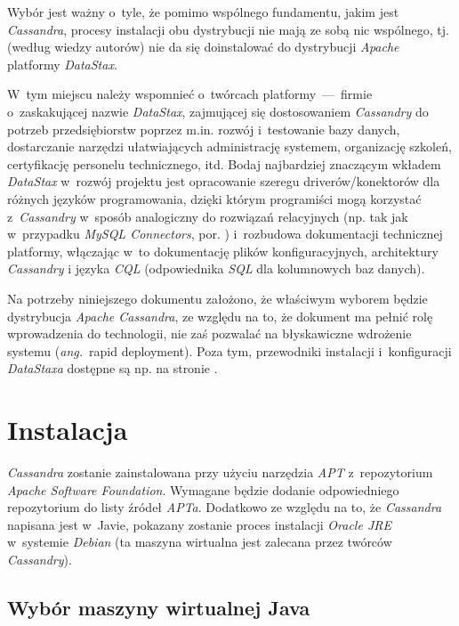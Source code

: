 \documentclass{article} %
\begin{document}
Wybór jest ważny o~tyle, że pomimo wspólnego fundamentu, jakim jest \emph{Cassandra}, procesy instalacji obu dystrybucji nie mają ze sobą nic wspólnego, tj. (według wiedzy autorów) nie da się doinstalować do dystrybucji \emph{Apache} platformy \emph{DataStax}.

W~tym miejscu należy wspomnieć o~twórcach platformy~---~firmie o~zaskakującej nazwie \emph{DataStax}, zajmującej się dostosowaniem \emph{Cassandry} do potrzeb przedsiębiorstw poprzez m.in. rozwój i~testowanie bazy danych, dostarczanie narzędzi ułatwiających administrację systemem, organizację szkoleń, certyfikację personelu technicznego, itd.
Bodaj najbardziej znaczącym wkładem \emph{DataStax} w~rozwój projektu jest opracowanie szeregu driverów/konektorów dla różnych języków programowania, dzięki którym programiści mogą korzystać z~\emph{Cassandry} w~sposób analogiczny do rozwiązań relacyjnych (np. tak jak w~przypadku \emph{MySQL Connectors}, por. \cite{mysql_connectors}) i~rozbudowa dokumentacji technicznej platformy, włączając w~to dokumentację plików konfiguracyjnych, architektury \emph{Cassandry} i języka \emph{CQL} (odpowiednika \emph{SQL} dla kolumnowych baz danych).

Na potrzeby niniejszego dokumentu założono, że właściwym wyborem będzie dystrybucja \emph{Apache Cassandra}, ze względu na to, że dokument ma pełnić rolę wprowadzenia do technologii, nie zaś pozwalać na błyskawiczne wdrożenie systemu (\textit{ang.}~rapid deployment).
Poza tym, przewodniki instalacji i~konfiguracji \emph{DataStaxa} dostępne są np. na stronie \cite{datastax_guides}.

\section{Instalacja}\label{sec:install}

\emph{Cassandra} zostanie zainstalowana przy użyciu narzędzia \emph{APT} z~repozytorium \emph{Apache Software Foundation}.
Wymagane będzie dodanie odpowiedniego repozytorium do listy źródeł \emph{APTa}.
Dodatkowo ze względu na to, że \emph{Cassandra} napisana jest w~Javie, pokazany zostanie proces instalacji \emph{Oracle JRE} w~systemie \emph{Debian} (ta maszyna wirtualna jest zalecana przez twórców \emph{Cassandry}).

\subsection{Wybór maszyny wirtualnej Java}\label{subsec:install_vm}
\end{document}
